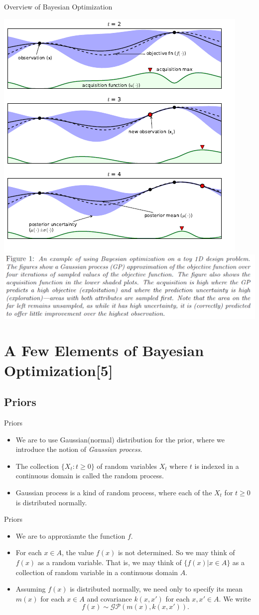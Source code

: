 \documentclass{beamer}
\begin{document}
%
\begin{frame}{Overview of Bayesian Optimization}
\begin{center}
\includegraphics[width=.5\textwidth]{overview_1}
\includegraphics[width=.5\textwidth]{overview_2}
\end{center}
\end{frame}


\section{A Few Elements of Bayesian Optimization[5]}

\subsection{Priors}
\begin{frame}{Priors}
\begin{itemize}
\item
We are to use Gaussian(normal) distribution for the prior, where we introduce the notion of \emph{Gaussian process}.
\item
The collection \(\{X_t:t\ge0\}\) of random variables \(X_t\) where \(t\) is indexed in a continuous domain is called the \alert{random process}.
\item
\alert{Gaussian process} is a kind of random process, where each of the \(X_t\) for \(t\ge0\) is distributed normally.
\end{itemize}
\end{frame}

\begin{frame}{Priors}
\begin{itemize}
\item
We are to approxiamte the function \(f\).
\item
For each \(x\in A\), the value \(f(x)\) is not determined.
So we may think of \(f(x)\) as a random variable.
That is, we may think of \(\{f(x)|x\in A\}\) as a collection of random variable in a continuous domain \(A\).
\item
Assuming \(f(x)\) is distributed normally, we need only to specify its mean \(m(x)\) for each \(x\in A\) and covariance \(k(x,x')\) for each \(x,x'\in A\).
We write
\[f(x)\sim \mathcal G\mathcal P(m(x),k(x,x')).\]
\end{itemize}
\end{frame}
\end{document}
